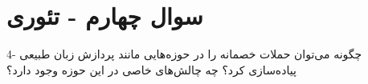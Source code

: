 \section{سوال چهارم - تئوری}
4- چگونه می‌توان حملات خصمانه را در حوزه‌هایی مانند پردازش زبان طبیعی پیاده‌سازی کرد؟ چه چالش‌های خاصی در این حوزه وجود دارد؟




\begin{qsolve}

\end{qsolve}


